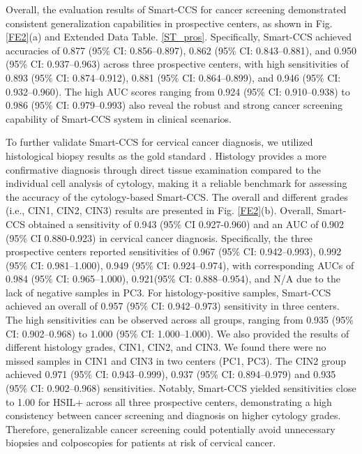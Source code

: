 Overall, the evaluation results of Smart-CCS for cancer screening demonstrated consistent generalization capabilities in prospective centers, as shown in Fig. \ref{FE2}(a) and Extended Data Table. \ref{ST_pros}. Specifically, Smart-CCS achieved accuracies of  0.877 (95\% CI: 0.856–0.897), 0.862 (95\% CI: 0.843–0.881), and 0.950 (95\% CI: 0.937–0.963) across three prospective centers, with high sensitivities of 0.893 (95\% CI: 0.874–0.912), 0.881 (95\% CI: 0.864–0.899), and 0.946 (95\% CI: 0.932–0.960). The high AUC scores ranging from 0.924 (95\% CI: 0.910–0.938) to 0.986 (95\% CI: 0.979–0.993) also reveal the robust and strong cancer screening capability of Smart-CCS system in clinical scenarios.

To further validate Smart-CCS for cervical cancer diagnosis, we utilized histological biopsy results as the gold standard \cite{ouh2021discrepancy}. Histology provides a more confirmative diagnosis through direct tissue examination compared to the individual cell analysis of cytology, making it a reliable benchmark for assessing the accuracy of the cytology-based Smart-CCS. The overall and different grades (i.e., CIN1, CIN2, CIN3) results are presented in Fig. \ref{FE2}(b). Overall, Smart-CCS obtained a sensitivity of 0.943 (95\% CI 0.927-0.960) and an AUC of 0.902 (95\% CI 0.880-0.923) in cervical cancer diagnosis. Specifically, the three prospective centers reported sensitivities of 0.967 (95\% CI: 0.942–0.993), 0.992 (95\% CI: 0.981–1.000), 0.949 (95\% CI: 0.924–0.974), with corresponding AUCs of 0.984 (95\% CI: 0.965–1.000), 0.921(95\% CI: 0.888–0.954), and N/A due to the lack of negative samples in PC3. For histology-positive samples, Smart-CCS achieved an overall of 0.957 (95\% CI: 0.942–0.973) sensitivity in three centers. The high sensitivities can be observed across all groups, ranging from 0.935 (95\% CI: 0.902–0.968) to 1.000 (95\% CI: 1.000–1.000). We also provided the results of different histology grades, CIN1, CIN2, and CIN3. We found there were no missed samples in CIN1 and CIN3 in two centers (PC1, PC3). The CIN2 group achieved 0.971 (95\% CI: 0.943–0.999), 0.937 (95\% CI: 0.894–0.979) and 0.935 (95\% CI: 0.902–0.968) sensitivities.
Notably, Smart-CCS yielded sensitivities close to 1.00 for HSIL+ across all three prospective centers, demonstrating a high consistency between cancer screening and diagnosis on higher cytology grades. 
Therefore, generalizable cancer screening could potentially avoid unnecessary biopsies and colposcopies for patients at risk of cervical cancer. 

